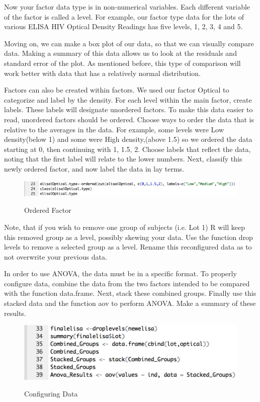 \documentclass[11pt]{article}
\begin{document}
Now your factor data type is in non-numerical variables. Each different variable of the factor is called a level. For example, our factor type data for the lots of various ELISA HIV Optical Density Readings has five levels, 1, 2, 3, 4 and 5.

Moving on, we can make a box plot of our data, so that we can visually compare data. Making a summary of this data allows us to look at the residuals and standard error of the plot. As mentioned before, this type of comparison will work better with data that has a relatively normal distribution. 

Factors can also be created within factors. We used our factor Optical to categorize and label by the density. For each level within the main factor, create labels. These labels will designate unordered factors. To make this data easier to read, unordered factors should be ordered. Choose ways to order the data that is relative to the averages in the data. For example, some levels were Low density(below 1) and some were High density,(above 1.5) so we ordered the data starting at 0, then continuing with 1, 1.5, 2. Choose labels that reflect the data, noting that the first label will relate to the lower numbers. Next, classify this newly ordered factor, and now label the data in lay terms. 
\begin{figure}[H] %
   \centering
      \caption{Ordered Factor}
   \includegraphics[scale=0.5]{ordered1.png} 
   \label{fig:ordered}
\end{figure}

Note, that if you wish to remove one group of subjects (i.e. Lot 1) R will keep this removed group as a level, possibly skewing your data. Use the function drop levels to remove a selected group as a level. Rename this reconfigured data as to not overwrite your previous data. 

In order to use ANOVA, the data must be in a specific format. To properly configure data, combine the data from the two factors intended to be compared with the function data.frame. Next, stack these combined groups. Finally use this stacked data and the function aov to perform ANOVA. Make a summary of these results.
\begin{figure}[H] %
   \centering
      \caption{Configuring Data}
   \includegraphics[scale=0.5]{stacked.png} 
   \label{fig:stacked}
\end{figure}
\end{document}
